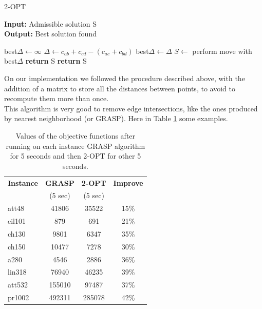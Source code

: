 \begin{algorithm}
	\caption{2-OPT}\label{2-OPT method}
	\hspace*{\algorithmicindent} \textbf{Input:} Admissible solution S \\
	\hspace*{\algorithmicindent} \textbf{Output:} Best solution found
    \begin{algorithmic}[1]
			\State best$\Delta \leftarrow \infty$
				\State $\Delta \leftarrow c_{ab} + c_{cd} - (c_{ac} + c_{bd})$ 
					\State best$\Delta \leftarrow \Delta$
				\EndIf
			\EndFor
				\State $S \leftarrow$ perform move with best$\Delta$
			\Else
				\State \textbf{return} S
			\EndIf
		\EndWhile
		\State \textbf{return} S
    \end{algorithmic}
\end{algorithm}

\noindent On our implementation we followed the procedure described above, with the addition of a matrix to store all the distances between points, to avoid to recompute them more than once.\\
This algorithm is very good to remove edge intersections, like the ones produced  by nearest neighborhood (or GRASP). Here in Table \ref{tab:twoopt} some examples.\\ 

\begin{table}[h!]
	\begin{center}
		\begin{tabular}{l|c|c|c}
			\textbf{Instance} & \textbf{GRASP} & \textbf{2-OPT} & \textbf{Improve}	\\
			& (5 sec) & (5 sec) & \\
			\hline
			att48 & 41806 & 35522 & 15\% \\
			eil101 & 879 & 691 & 21\% \\
			ch130 & 9801 & 6347 & 35\% \\
			ch150 & 10477 & 7278 & 30\% \\
			a280 & 4546 & 2886 & 36\% \\
			lin318 & 76940 & 46235 & 39\% \\ 
			att532 & 155010 & 97487 & 37\% \\	
			pr1002 & 492311 & 285078 & 42\% \\
		\end{tabular}
		\caption{Values of the objective functions after running on each instance GRASP algorithm for 5 seconds and then 2-OPT for other 5 seconds.}
		\label{tab:twoopt}
	\end{center}
\end{table}

